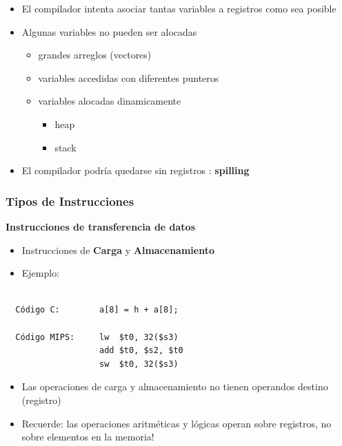 \documentclass[aspectratio=169,compress]{beamer}
\begin{document}
\begin{footnotesize}
\begin{frame}[fragile]
\begin{itemize}
\item El compilador intenta asociar tantas variables a registros como sea posible
\item Algunas variables no pueden ser alocadas
\begin{itemize}
\item grandes arreglos (vectores)
\item variables accedidas con diferentes punteros
\item variables alocadas dinamicamente
\begin{itemize}
\item heap
\item stack
\end{itemize}
\end{itemize}
\item El compilador podría quedarse sin registros : \textbf{spilling}
\end{itemize}
\end{frame}



\begin{frame}[fragile]
\frametitle{Tipos de Instrucciones}
\begin{center}\textbf{Instrucciones de transferencia de datos}\end{center}

\begin{itemize}
\item Instrucciones de \textbf{Carga} y \textbf{Almacenamiento}
\item Ejemplo:
\end{itemize}
\begin{verbatim}

  Código C:        a[8] = h + a[8];

  Código MIPS:     lw  $t0, 32($s3)
                   add $t0, $s2, $t0
                   sw  $t0, 32($s3)
\end{verbatim}
\begin{itemize}
\item Las operaciones de carga y almacenamiento no tienen operandos destino (registro)
\item Recuerde: las operaciones aritméticas y lógicas operan sobre registros, no sobre elementos en la memoria!
\end{itemize}
\end{frame}





\end{footnotesize}
\end{document}

